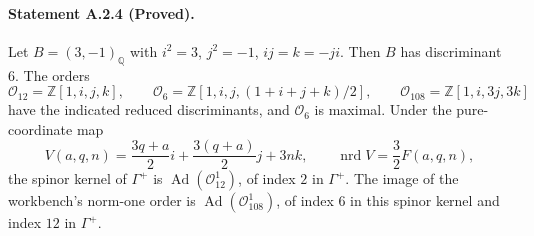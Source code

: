 \paragraph{Statement A.2.4 (Proved).}
Let $B=(3,-1)_{\mathbb Q}$ with $i^2=3$, $j^2=-1$, $ij=k=-ji$.
Then $B$ has discriminant $6$. The orders
\[
 \mathcal O_{12}=\mathbb Z[1,i,j,k],\qquad
 \mathcal O_6=\mathbb Z[1,i,j,(1+i+j+k)/2],\qquad
 \mathcal O_{108}=\mathbb Z[1,i,3j,3k]
\]
have the indicated reduced discriminants, and $\mathcal O_6$ is maximal.
Under the pure-coordinate map
\[
 V(a,q,n)=\frac{3q+a}{2}i+\frac{3(q+a)}2j+3nk,
 \qquad \operatorname{nrd}V=\frac32F(a,q,n),
\]
the spinor kernel of $\Gamma^+$ is
$\operatorname{Ad}(\mathcal O_{12}^{1})$, of index $2$ in $\Gamma^+$.
The image of the workbench's norm-one order is
$\operatorname{Ad}(\mathcal O_{108}^{1})$, of index $6$ in this spinor
kernel and index $12$ in $\Gamma^+$.
